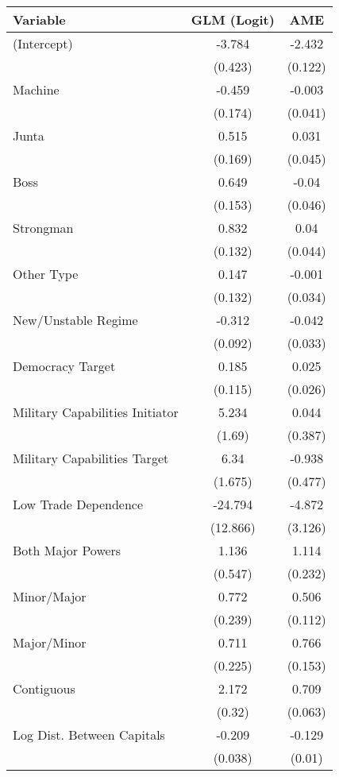 \begin{table}[ht]
\centering
\begingroup\footnotesize
\begin{tabular}{lcc}
 Variable & GLM (Logit) & AME \\
  \hline
\hline
(Intercept) & -3.784 & -2.432 \\
   & (0.423) & (0.122) \\
  Machine & -0.459 & -0.003 \\
   & (0.174) & (0.041) \\
  Junta & 0.515 & 0.031 \\
   & (0.169) & (0.045) \\
  Boss & 0.649 & -0.04 \\
   & (0.153) & (0.046) \\
  Strongman & 0.832 & 0.04 \\
   & (0.132) & (0.044) \\
  Other Type & 0.147 & -0.001 \\
   & (0.132) & (0.034) \\
  New/Unstable Regime & -0.312 & -0.042 \\
   & (0.092) & (0.033) \\
  Democracy Target & 0.185 & 0.025 \\
   & (0.115) & (0.026) \\
  Military Capabilities Initiator & 5.234 & 0.044 \\
   & (1.69) & (0.387) \\
  Military Capabilities Target  & 6.34 & -0.938 \\
   & (1.675) & (0.477) \\
  Low Trade Dependence  & -24.794 & -4.872 \\
   & (12.866) & (3.126) \\
  Both Major Powers & 1.136 & 1.114 \\
   & (0.547) & (0.232) \\
  Minor/Major & 0.772 & 0.506 \\
   & (0.239) & (0.112) \\
  Major/Minor & 0.711 & 0.766 \\
   & (0.225) & (0.153) \\
  Contiguous & 2.172 & 0.709 \\
   & (0.32) & (0.063) \\
  Log Dist. Between Capitals & -0.209 & -0.129 \\
   & (0.038) & (0.01) \\

\end{tabular}
\end{table}
